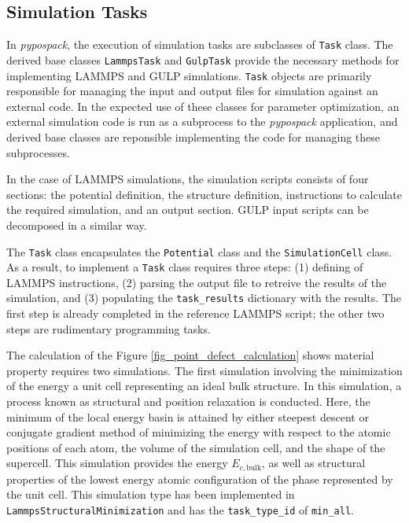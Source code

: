 \subsection{Simulation Tasks}
\label{sec:pypospack_tasks}

In \emph{pypospack}, the execution of simulation tasks are subclasses of \verb|Task| class.  The derived base classes \verb|LammpsTask| and \verb|GulpTask| provide the necessary methods for implementing LAMMPS and GULP simulations. \verb|Task| objects are primarily responsible for managing the input and output files for simulation against an external code.  In the expected use of these classes for parameter optimization, an external simulation code is run as a  subprocess to the  \emph{pypospack} application, and derived base classes are reponsible implementing the code for managing these subprocesses.

In the case of LAMMPS simulations, the simulation scripts consists of four sections:  the potential definition, the structure definition, instructions to calculate the required simulation, and an output section.  GULP input scripts can be decomposed in a similar way.

 The \verb|Task| class encapsulates the \verb|Potential| class and the \verb|SimulationCell| class.  As a result, to implement a \verb|Task| class requires three steps: (1) defining of LAMMPS instructions, (2) parsing the output file to retreive the results of the simulation, and (3) populating the \verb|task_results| dictionary with the results.  The first step is already completed in the reference LAMMPS script; the other two steps are rudimentary programming tasks.

The calculation of the Figure \ref{fig_point_defect_calculation} shows material property requires two simulations.  The first simulation involving the minimization of the energy a unit cell representing an ideal bulk structure.  In this simulation, a process known as structural and position relaxation is conducted.  Here, the  minimum of the local energy basin is attained by either steepest descent or conjugate gradient method of minimizing the energy with respect to the atomic positions of each atom, the volume of the simulation cell, and the shape of the supercell.  This simulation provides the energy $E_{c,\mathrm{bulk}}$, as well as structural properties of the lowest energy atomic configuration of the phase represented by the unit cell.  This simulation type has been implemented in  \verb|LammpsStructuralMinimization| and has the \verb|task_type_id| of \verb|min_all|.

